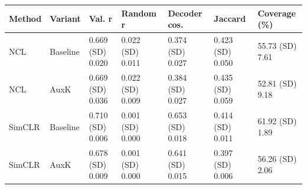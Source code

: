 \begin{tabular}{lllllll}
\toprule
Method & Variant & Val. r & Random r & Decoder cos. & Jaccard & Coverage (\%) \\
\midrule
NCL & Baseline & 0.669 (SD) 0.020 & 0.022 (SD) 0.011 & 0.374 (SD) 0.027 & 0.423 (SD) 0.050 & 55.73 (SD) 7.61 \\
NCL & AuxK & 0.669 (SD) 0.036 & 0.022 (SD) 0.009 & 0.384 (SD) 0.027 & 0.435 (SD) 0.059 & 52.81 (SD) 9.18 \\
SimCLR & Baseline & 0.710 (SD) 0.006 & 0.001 (SD) 0.000 & 0.653 (SD) 0.018 & 0.414 (SD) 0.011 & 61.92 (SD) 1.89 \\
SimCLR & AuxK & 0.678 (SD) 0.009 & 0.001 (SD) 0.000 & 0.641 (SD) 0.015 & 0.397 (SD) 0.006 & 56.26 (SD) 2.06 \\
\bottomrule
\end{tabular}
